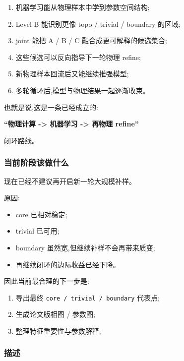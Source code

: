 \documentclass[lang=cn,scheme=chinese,color=blue,device=normal,toc=onecol,math=cm]{elegantbook}
\begin{document}
\begin{enumerate}
\item 机器学习能从物理样本中学到参数空间结构;
\item Level B 能识别更像 topo /\allowbreak{} trivial /\allowbreak{} boundary 的区域;
\item joint 能把 A /\allowbreak{} B /\allowbreak{} C 融合成更可解释的候选集合;
\item 这些候选可以反向指导下一轮物理 refine;
\item 新物理样本回流后又能继续推强模型;
\item 多轮循环后,模型与物理结果一起逐渐收束。
\end{enumerate}


也就是说,这是一条已经成立的:\par


\textbf{“物理计算 -> 机器学习 -> 再物理 refine”}\par


闭环路线。\par


\subsubsection{当前阶段该做什么}


现在已经不建议再开启新一轮大规模补样。\par


原因:\par


\begin{itemize}
\item core 已相对稳定;
\item trivial 已可用;
\item boundary 虽然宽,但继续补样不会再带来质变;
\item 再继续闭环的边际收益已经下降。
\end{itemize}


因此当前最合理的下一步是:\par


\begin{enumerate}
\item 导出最终 \texttt{core /\allowbreak{} trivial /\allowbreak{} boundary} 代表点;
\item 生成论文版相图 /\allowbreak{} 参数图;
\item 整理特征重要性与参数解释;
\end{enumerate}


\subsubsection{描述}
\end{document}
